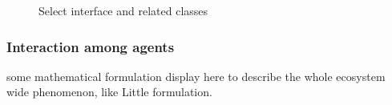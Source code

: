\begin{figure}[htbp]
    \centering
    \scriptsize
    \begin{tikzpicture}
    
    
    
    \end{tikzpicture}
    \caption{Select interface and related classes}
    \label{fig:selectinterface}
\end{figure}
\subsubsection{Interaction among agents}
some mathematical formulation display here to describe the whole ecosystem wide phenomenon, like Little formulation.


